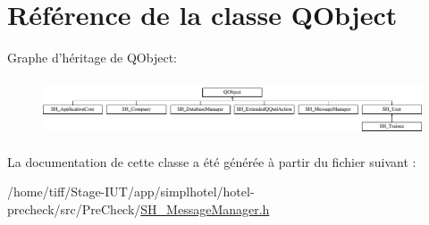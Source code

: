 \hypertarget{classQObject}{\section{Référence de la classe Q\-Object}
\label{classQObject}
}
Graphe d'héritage de Q\-Object\-:\begin{figure}[H]
\begin{center}
\leavevmode
\includegraphics[height=1.707317cm]{classQObject}
\end{center}
\end{figure}


La documentation de cette classe a été générée à partir du fichier suivant \-:\begin{DoxyCompactItemize}
\item 
/home/tiff/\-Stage-\/\-I\-U\-T/app/simplhotel/hotel-\/precheck/src/\-Pre\-Check/\hyperlink{SH__MessageManager_8h}{S\-H\-\_\-\-Message\-Manager.\-h}\end{DoxyCompactItemize}
